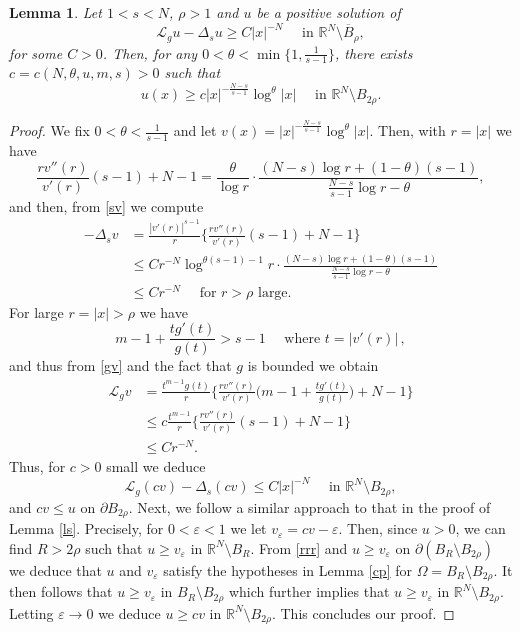 \documentclass[leqno,12pt]{article}
\numberwithin{equation}{section}
\newcommand{\R}{\mathbb R}
\newcommand{\Lg}{{\mathcal L}_g}
\newtheorem{lemma}[theorem]{Lemma}
\begin{document}
\begin{lemma}\label{ls1}
Let $1<s<N$, $\rho>1$ and $u$ be a positive solution of 
$$
\Lg u-\Delta_s u\geq C|x|^{-N} \quad\mbox{ in }\R^N\setminus \overline B_\rho,
$$ 
for some $C>0$.
Then, for any $0<\theta<\min\{1,\frac{1}{s-1}\}$, there exists $c=c(N, \theta, u,  m,s)>0$ such that 
$$
u(x)\geq c|x|^{-\frac{N-s}{s-1}}\log^\theta |x|\quad\mbox{ in }\R^N\setminus B_{2\rho}.
$$
\end{lemma}
\begin{proof} We fix $0<\theta<\frac{1}{s-1}$ and let $v(x)=|x|^{-\frac{N-s}{s-1}}\log^\theta |x|$. Then, with $r=|x|$ we have 
$$
\frac{rv''(r)}{v'(r)}(s-1)+N-1=\frac{\theta}{\log r}\cdot \frac{(N-s)\log r+(1-\theta)(s-1)}{\frac{N-s}{s-1}\log r-\theta},
$$
and then, from \eqref{sv} we compute
$$
\begin{aligned}
-\Delta_s v&=\frac{|v'(r)|^{s-1}}{r}\Big\{\frac{rv''(r)}{v'(r)}(s-1)+N-1\Big\}\\
&\leq C r^{-N}\log^{\theta(s-1)-1} r \cdot \frac{(N-s)\log r+(1-\theta)(s-1)}{\frac{N-s}{s-1}\log r-\theta}\\
&\leq C r^{-N}\quad\mbox{ for $r>\rho$ large}.
\end{aligned}
$$
For large $r=|x|>\rho$ we have 
$$
m-1+\frac{tg'(t)}{g(t)}>s-1 \quad\mbox{ where }t=|v'(r)|\, ,
$$
and thus from \eqref{gv} and the fact that $g$ is bounded we obtain
$$
\begin{aligned}
\Lg v&=\frac{t^{m-1}g(t)}{r}\Big\{\frac{rv''(r)}{v'(r)}\Big(m-1+\frac{tg'(t)}{g(t)}\Big)+N-1\Big\}\\
&\leq c\frac{t^{m-1}}{r}\Big\{\frac{rv''(r)}{v'(r)}(s-1)+N-1\Big\}\\
&\leq C r^{-N}.
\end{aligned}
$$
Thus, for $c>0$ small we deduce
\begin{equation}\label{rrr}
\Lg (cv)-\Delta_s (cv)\leq C|x|^{-N} \quad\mbox{ in }\R^N\setminus B_{2\rho},
\end{equation}
 and $cv\leq u$ on $\partial B_{2\rho}$. 
Next, we follow a similar approach to that in the proof of Lemma \ref{ls}. Precisely, for $0<\varepsilon<1$ we let $v_{\varepsilon}=cv-\varepsilon$. Then, since $u>0$, we can find $R>2\rho$ such that $u\geq v_\varepsilon$ in $\R^N\setminus B_{R}$. From \eqref{rrr} and $u\geq v_\varepsilon$ on $\partial (B_{R}\setminus B_{2\rho})$ we deduce that $u$ and $v_\varepsilon$ satisfy the hypotheses in Lemma \ref{cp} for $\Omega=B_{R}\setminus B_{2\rho}$. It then follows that $u\geq v_\varepsilon$ in $B_{R}\setminus B_{2\rho}$ which further implies that $u\geq v_\varepsilon$ in $\R^N\setminus B_{2\rho}$. Letting $\varepsilon\to 0$ we deduce $u\geq cv$ in $\R^N\setminus B_{2\rho}$.  This concludes our proof.
\end{proof}
\end{document}

